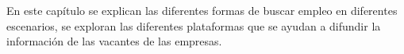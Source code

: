 \selectfont

En este capítulo se explican las diferentes formas de buscar empleo en diferentes escenarios, se 
exploran las diferentes plataformas que se ayudan a difundir la información de las vacantes de las empresas.







